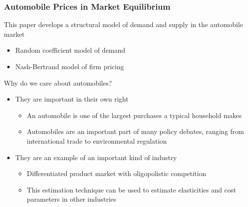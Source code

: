 \documentclass{beamer}
\begin{document}
\begin{frame}\frametitle{Automobile Prices in Market Equilibrium}
    This paper develops a structural model of demand and supply in the automobile market
    \begin{itemize}
    	\item Random coefficient model of demand
        \item Nash-Bertrand model of firm pricing
    \end{itemize}
    \vspace{2ex}
    Why do we care about automobiles?
    \begin{itemize}
        \item They are important in their own right
        \begin{itemize}
            \item An automobile is one of the largest purchases a typical household makes
            \item Automobiles are an important part of many policy debates, ranging from international trade to environmental regulation 
        \end{itemize}
        \item They are an example of an important kind of industry
        \begin{itemize}
            \item Differentiated product market with oligopolistic competition
            \item This estimation technique can be used to estimate elasticities and cost parameters in other industries
        \end{itemize}
    \end{itemize}
\end{frame}
\end{document}
